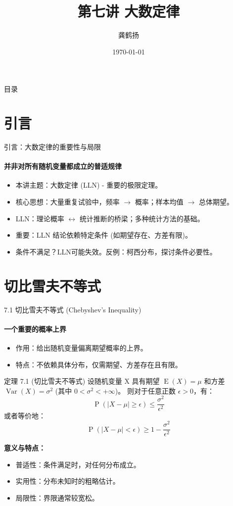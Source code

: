 \documentclass[UTF8]{beamer}
\title{第七讲 大数定律}
\author{龚鹤扬}
\institute{中国科学技术大学统计学博士} %
\date{\today}
\DeclareMathOperator{\E}{\operatorname{E}}
\DeclareMathOperator{\Var}{\operatorname{Var}}
\DeclareMathOperator{\Prob}{\operatorname{P}}
\begin{document}
\begin{frame}
    \titlepage
\end{frame}

\begin{frame}{目录}
    \tableofcontents
\end{frame}

\section{引言}
\begin{frame}{引言：大数定律的重要性与局限}
    \framesubtitle{并非对所有随机变量都成立的普适规律}
    \begin{itemize}
        \item 本讲主题：\alert{大数定律 (LLN)} - 重要的极限定理。
        \item 核心思想：大量重复试验中，\alert{频率} $\to$ \alert{概率}；样本均值 $\to$ 总体\alert{期望}。
        \item LLN：\alert{理论概率} $\leftrightarrow$ \alert{统计推断}的桥梁；多种统计方法的基础。
        \item \alert{重要}：LLN 结论依赖特定\alert{条件} (如期望存在、方差有限)。
        \item 条件不满足？LLN可能失效。反例：\alert{柯西分布}，探讨条件必要性。
    \end{itemize}
\end{frame}

\section{切比雪夫不等式}
\begin{frame}[shrink=5]{7.1 切比雪夫不等式 (Chebyshev's Inequality)}
    \framesubtitle{一个重要的概率上界}
    \begin{itemize}
        \item 作用：给出随机变量偏离期望概率的\alert{上界}。
        \item 特点：不依赖具体分布，仅需\alert{期望、方差}存在且有限。
    \end{itemize}
    \pause
    \begin{block}{定理 7.1 (切比雪夫不等式)}
        设随机变量 X 具有期望 $\E(X) = \mu$ 和方差 $\Var(X) = \sigma^2$ (其中 $0 < \sigma^2 < +\infty$)。
        则对于任意正数 $\epsilon > 0$，有：
        \[ \Prob(|X - \mu| \geq \epsilon) \leq \frac{\sigma^2}{\epsilon^2} \]
        或者等价地：
        \[ \Prob(|X - \mu| < \epsilon) \geq 1 - \frac{\sigma^2}{\epsilon^2} \]
    \end{block}
    \pause
    \textbf{意义与特点：}
    \begin{itemize}
        \item \alert{普适性}：条件满足时，对任何分布成立。
        \item \alert{实用性}：分布未知时的粗略估计。
        \item \alert{局限性}：界限通常较宽松。
    \end{itemize}
\end{frame}
\end{document}
